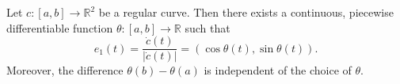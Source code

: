 Let $c: [a, b] \to \mathbb{R}^2$ be a regular curve. Then there exists a continuous, piecewise differentiable function $\theta: [a, b] \to \mathbb{R}$ such that
$$e_1(t) = \frac{\dot{c}(t)}{|\dot{c}(t)|} = (\cos \theta(t), \sin \theta(t)).$$
Moreover, the difference $\theta(b) - \theta(a)$ is independent of the choice of $\theta$.

